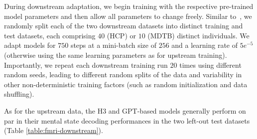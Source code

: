 During downstream adaptation, we begin training with the respective pre-trained model parameters and then allow all parameters to change freely. Similar to~\citep{thomas_fmri_2022}, we randomly split each of the two downstream datasets into distinct training and test datasets, each comprising $40$ (HCP) or $10$ (MDTB) distinct individuals. We adapt models for $750$ steps at a mini-batch size of $256$ and a learning rate of $5e^{-5}$ (otherwise using the same learning parameters as for upstream training). Importantly, we repeat each downstream training run $20$ times using different random seeds, leading to different random splits of the data and variability in other non-deterministic training factors (such as random initialization and data shuffling).

As for the upstream data, the H3 and GPT-based models generally perform on par in their mental state decoding performances in the two left-out test datasets (Table \ref{table:fmri-downstream}).

